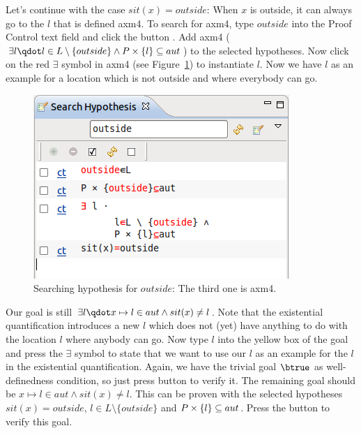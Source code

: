
Let's continue with the case $sit(x)=outside$: When $x$ is outside, it can always go to the $l$ that is defined \textsf{axm4}.
To search for \textsf{axm4}, type $outside$ into the \textsf{Proof Control} text field and click the button . Add \textsf{axm4} ($\exists l\qdot l\in L\setminus\{outside\} \land P\cprod\{l\}\subseteq aut$) to the selected hypotheses. Now click on the red $\exists$ symbol in \textsf{axm4} (see Figure~\ref{fig_tut_10_search_hypotheses})
to instantiate $l$.
Now we have $l$ as an example for a location which is not outside and where everybody can go.
\begin{figure}[!ht]
  \begin{center}
    \includegraphics{img/tutorial/tut_10_search_hyp.png}
    \caption{Searching hypothesis for $outside$: The third one is \textsf{axm4}.}
    \label{fig_tut_10_search_hypotheses}
  \end{center}
\end{figure}
Our goal is still $\exists l\qdot x\mapsto l\in aut \land sit(x)\neq l$.
Note that the existential quantification introduces a new $l$ which does not (yet) have anything to do with
 the location $l$ where anybody can go.
Now type $l$ into the yellow box of the goal and press the $\exists$ symbol to state that we want to use our $l$ as
  an example for the $l$ in the existential quantification.
Again, we have the trivial goal $\btrue$ as well-definedness condition, so just press  button to verify it.
The remaining goal should be $x\mapsto l\in aut \land sit(x)\neq l$.
This can be proven with the selected hypotheses $sit(x)=outside$, $l\in L\setminus\{outside\}$ and $P\mathbin\times\{l\}\subseteq aut$. Press the  button to verify this goal.


